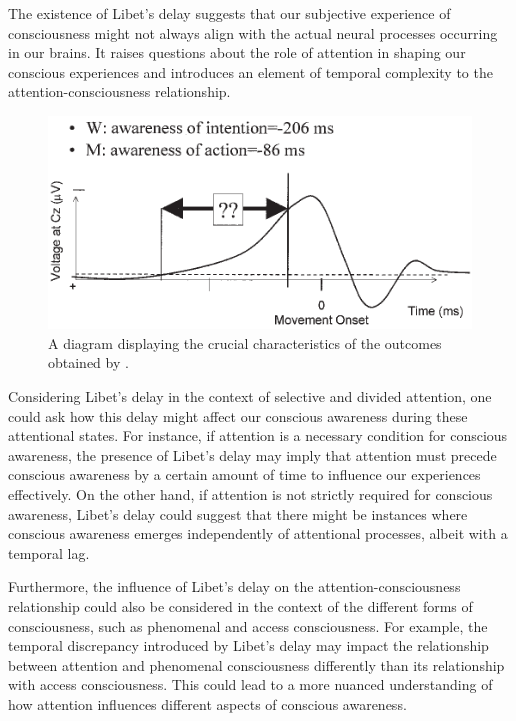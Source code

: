 \documentclass[10pt]{article}
\begin{document}
\begin{sloppypar}
  The existence of Libet’s delay suggests that our subjective experience of consciousness might not always align with the actual neural processes occurring in our brains. It raises questions about the role of attention in shaping our conscious experiences and introduces an element of temporal complexity to the attention-consciousness relationship.

  \begin{figure}[ht]
    \centering
    \includegraphics[width=\textwidth]{figures/libet.png}
    \caption[A diagram displaying the crucial characteristics of the outcomes obtained by Libet et al.]{A diagram displaying the crucial characteristics of the outcomes obtained by \cite{libet_time_1983} \citep{haggard_conscious_2001}.}
    \label{fig:libet-diagram}
  \end{figure}

  Considering Libet’s delay in the context of selective and divided attention, one could ask how this delay might affect our conscious awareness during these attentional states. For instance, if attention is a necessary condition for conscious awareness, the presence of Libet’s delay may imply that attention must precede conscious awareness by a certain amount of time to influence our experiences effectively. On the other hand, if attention is not strictly required for conscious awareness, Libet’s delay could suggest that there might be instances where conscious awareness emerges independently of attentional processes, albeit with a temporal lag.

  Furthermore, the influence of Libet’s delay on the attention-consciousness relationship could also be considered in the context of the different forms of consciousness, such as phenomenal and access consciousness. For example, the temporal discrepancy introduced by Libet’s delay may impact the relationship between attention and phenomenal consciousness differently than its relationship with access consciousness. This could lead to a more nuanced understanding of how attention influences different aspects of conscious awareness.


\end{sloppypar}
\end{document}
